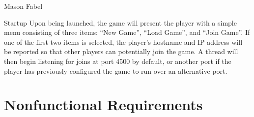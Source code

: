 \documentclass[12pt]{report}
\begin{document}
\begin{section}{Mason Fabel}
\begin{subsection}{Startup}
Upon being launched, the game will present the player with a simple menu
consisting of three items: ``New Game'', ``Load Game'', and ``Join Game''.
If one of the first two items is selected, the player's hostname and IP
address will be reported so that other players can potentially join the
game. A thread will then begin listening for joins at port 4500 by default,
or another port if the player has previously configured the game to run
over an alternative port.
\end{subsection}
\end{section}

\chapter{Nonfunctional Requirements}
\end{document}
